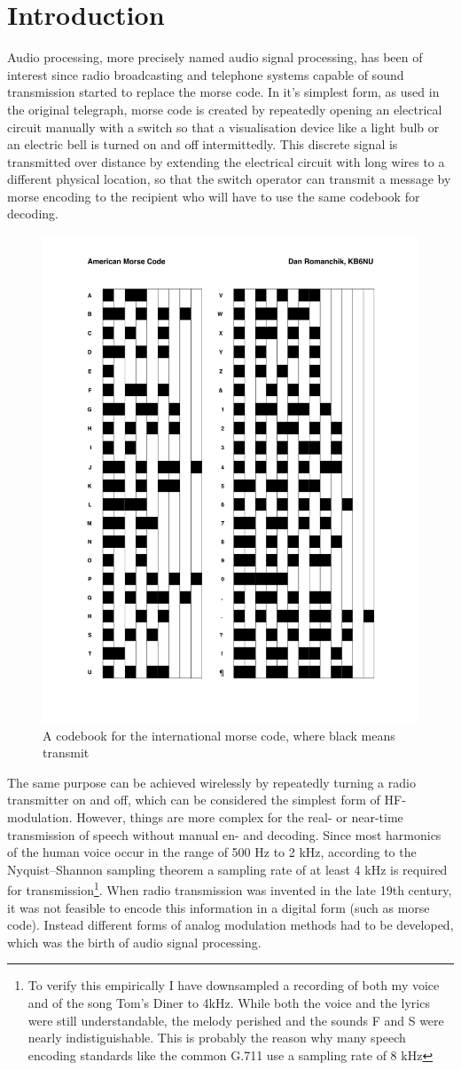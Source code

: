 \chapter{Introduction}
\label{Introduction}

Audio processing, more precisely named audio signal processing, has been of interest since radio broadcasting and telephone systems capable of sound transmission started to replace the morse code\cite{spanias2006audio}. In it's simplest form, as used in the original telegraph, morse code is created by repeatedly opening an electrical circuit manually with a switch so that a visualisation device like a light bulb or an electric bell is turned on and off intermittedly. This discrete signal is transmitted over distance by extending the electrical circuit with long wires to a different physical location, so that the switch operator can transmit a message by morse encoding to the recipient who will have to use the same codebook for decoding.

\begin{figure}[h]
    \centering
	\includegraphics[width=.45\textwidth]{./images/illustrations/morse-chart}
    \caption{A codebook for the international morse code, where black means transmit}
    \label{fig:morse}
\end{figure}

The same purpose can be achieved wirelessly by repeatedly turning a radio transmitter on and off, which can be considered the simplest form of HF-modulation. However, things are more complex for the real- or near-time transmission of speech without manual en- and decoding. Since most harmonics of the human voice occur in the range of 500 Hz to 2 kHz, according to the Nyquist–Shannon sampling theorem a sampling rate of at least 4 kHz is required for transmission\footnote{To verify this empirically I have downsampled a recording of both my voice and of the song Tom's Diner to 4kHz. While both the voice and the lyrics were still understandable, the melody perished and the sounds F and S were nearly indistiguishable. This is probably the reason why many speech encoding standards like the common G.711 use a sampling rate of 8 kHz}. When radio transmission was invented in the late 19th century, it was not feasible to encode this information in a digital form (such as morse code). Instead different forms of analog modulation methods had to be developed, which was the birth of audio signal processing.

